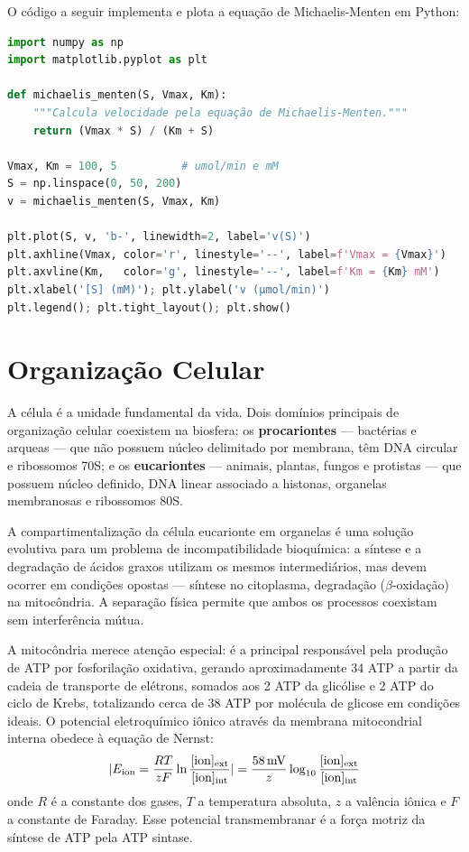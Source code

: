 O código a seguir implementa e plota a equação de Michaelis-Menten em Python:
\begin{lstlisting}[language=Python, caption=Simulação da cinética de Michaelis-Menten]
import numpy as np
import matplotlib.pyplot as plt

def michaelis_menten(S, Vmax, Km):
    """Calcula velocidade pela equação de Michaelis-Menten."""
    return (Vmax * S) / (Km + S)

Vmax, Km = 100, 5          # umol/min e mM
S = np.linspace(0, 50, 200)
v = michaelis_menten(S, Vmax, Km)

plt.plot(S, v, 'b-', linewidth=2, label='v(S)')
plt.axhline(Vmax, color='r', linestyle='--', label=f'Vmax = {Vmax}')
plt.axvline(Km,   color='g', linestyle='--', label=f'Km = {Km} mM')
plt.xlabel('[S] (mM)'); plt.ylabel('v (μmol/min)')
plt.legend(); plt.tight_layout(); plt.show()
\end{lstlisting}

\section{Organização Celular}

A célula é a unidade fundamental da vida. Dois domínios principais de organização celular
coexistem na biosfera: os \textbf{procariontes} --- bactérias e arqueas --- que não possuem
núcleo delimitado por membrana, têm DNA circular e ribossomos 70S; e os
\textbf{eucariontes} --- animais, plantas, fungos e protistas --- que possuem núcleo definido,
DNA linear associado a histonas, organelas membranosas e ribossomos 80S.

A compartimentalização da célula eucarionte em organelas é uma solução evolutiva para um
problema de incompatibilidade bioquímica: a síntese e a degradação de ácidos graxos
utilizam os mesmos intermediários, mas devem ocorrer em condições opostas --- síntese
no citoplasma, degradação ($\beta$-oxidação) na mitocôndria. A separação física permite
que ambos os processos coexistam sem interferência mútua.

A mitocôndria merece atenção especial: é a principal responsável pela produção de ATP
por fosforilação oxidativa, gerando aproximadamente 34 ATP a partir da cadeia de transporte
de elétrons, somados aos 2 ATP da glicólise e 2 ATP do ciclo de Krebs, totalizando cerca
de 38 ATP por molécula de glicose em condições ideais. O potencial eletroquímico iônico
através da membrana mitocondrial interna obedece à equação de Nernst:
\begin{equation}
|E_{\mathrm{ion}} = \frac{RT}{zF}\ln\frac{[\mathrm{ion}]_{\mathrm{ext}}}{[\mathrm{ion}]_{\mathrm{int}}}
|         = \frac{58\,\text{mV}}{z}\log_{10}\frac{[\mathrm{ion}]_{\mathrm{ext}}}{[\mathrm{ion}]_{\mathrm{int}}}
\end{equation}
onde $R$ é a constante dos gases, $T$ a temperatura absoluta, $z$ a valência iônica e
$F$ a constante de Faraday. Esse potencial transmembranar é a força motriz da síntese
de ATP pela ATP sintase.


